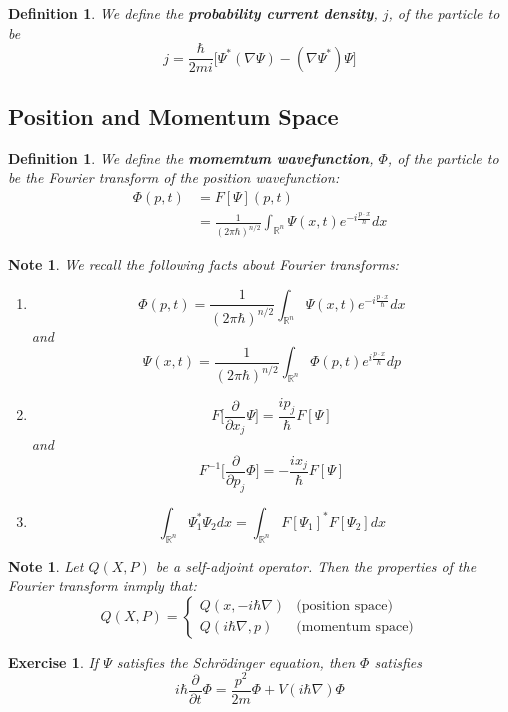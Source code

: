 \documentclass[12pt]{amsart}
\newtheorem{defn}[thm]{Definition}
\newtheorem{note}[thm]{Note}
\newtheorem{ex}[thm]{Exercise}
\newcommand{\R}{\mathbb{R}}
\newcommand{\p}[1]{\frac{\partial}{\partial{#1}}}
\begin{document}
\begin{defn}
We define the \textbf{probability current density}, $j$, of the particle to be $$j = \frac{\hbar}{2mi} \bigg[ \Psi^* (\nabla \Psi) - (\nabla \Psi^*) \Psi\bigg]$$ 
\end{defn}
\subsection{Position and Momentum Space}
\begin{defn}
We define the \textbf{momemtum wavefunction}, $\Phi$, of the particle to be the Fourier transform of the position wavefunction: 
\begin{align*}
\Phi(p,t) 
&= F[\Psi](p,t)\\
&= \frac{1}{(2 \pi \hbar)^{n/2}} \int_{\R ^n}\Psi(x,t)e^{-i \frac{p \cdot x}{\hbar} }dx
\end{align*}
\end{defn}

\begin{note}
We recall the following facts about Fourier transforms:
\begin{enumerate}
\item $$\Phi(p,t) = \frac{1}{(2 \pi \hbar)^{n/2}} \int_{\R ^n}\Psi(x,t)e^{-i \frac{p \cdot x}{\hbar} }dx $$ and $$\Psi(x,t) = \frac{1}{(2 \pi \hbar)^{n/2}} \int_{\R ^n}\Phi(p,t)e^{i \frac{p \cdot x}{\hbar} }dp $$

\item $$F\bigg[\p{x_j} \Psi \bigg] = \frac{i p_j}{\hbar}F[\Psi]$$
and $$F^{-1}\bigg[\p{p_j} \Phi \bigg] = -\frac{i x_j}{\hbar}F[\Psi]$$

\item $$\int_{\R^n} \Psi_1^* \Psi_2 dx = \int_{\R^n} F[\Psi_1]^* F[\Psi_2]dx$$
\end{enumerate}
\end{note}

\begin{note}
Let $Q(X,P)$ be a self-adjoint operator. Then the properties of the Fourier transform inmply that:
\[
Q(X,P)=
\begin{cases}
Q(x, -i\hbar \nabla) & \text{(position space)}\\
Q(i\hbar \nabla, p) & \text{(momentum space)}
\end{cases}
\]
\end{note}

\begin{ex}
If $\Psi$ satisfies the Schr\"{o}dinger equation, then $\Phi$ satisfies $$i\hbar \p{t}\Phi = \frac{p^2}{2m}\Phi + V(i \hbar \nabla)\Phi$$
\end{ex}
\end{document}
